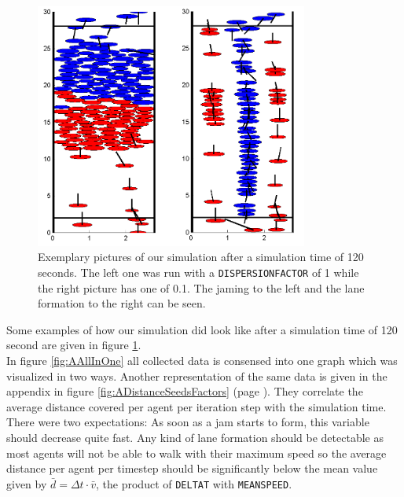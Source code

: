 
\begin{figure}[h!]
	\centering
		\includegraphics[width=0.8\textwidth]{pictures/ex2picture.png}
	\caption{Exemplary pictures of our simulation after a simulation time of 120 seconds. The left one was run with a \texttt{DISPERSIONFACTOR} of 1 while the right picture has one of 0.1. The jaming to the left and the lane formation to the right can be seen.}
	\label{fig:ex2picture}
\end{figure}

\noi Some examples of how our simulation did look like after a simulation time of 120 second are given in figure \ref{fig:ex2picture}.\\

\noi In figure \ref{fig:AAllInOne} all collected data is consensed into one graph which was visualized in two ways. Another representation of the same data is given in the appendix in figure \ref{fig:ADistanceSeedsFactors} (page \pageref{fig:ADistanceSeedsFactors}). They correlate the average distance covered per agent per iteration step with the simulation time. There were two expectations: As soon as a jam starts to form, this variable should decrease quite fast. Any kind of lane formation should be detectable as most agents will not be able to walk with their maximum speed so the average distance per agent per timestep should be significantly below the mean value given by $\bar{d} = \Delta t \cdot \bar{v}$, the product of \texttt{DELTAT} with \texttt{MEANSPEED}.\\
\pagebreak

